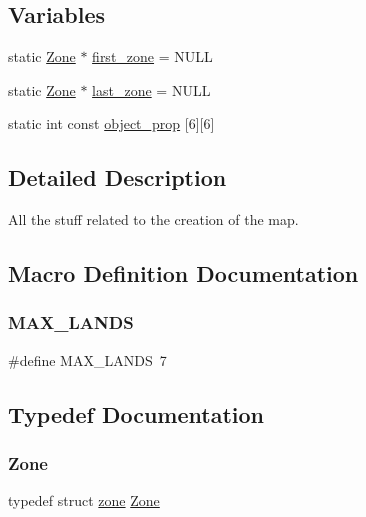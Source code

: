 \subsection*{Variables}
\begin{DoxyCompactItemize}
\item 
static \hyperlink{group__map_ga25bd5049e352284b30a6a239fa772249}{Zone} $\ast$ \hyperlink{group__map_ga77381c292d2d383101eda478b3147d99}{first\+\_\+zone} = N\+U\+LL
\item 
static \hyperlink{group__map_ga25bd5049e352284b30a6a239fa772249}{Zone} $\ast$ \hyperlink{group__map_ga74efc7d85bb74ab5ef4cde960e3c84f5}{last\+\_\+zone} = N\+U\+LL
\item 
static int const \hyperlink{group__map_gaf2350ea2b3737b32c80c5cc2b1e8c434}{object\+\_\+prop} \mbox{[}6\mbox{]}\mbox{[}6\mbox{]}
\end{DoxyCompactItemize}


\subsection{Detailed Description}
All the stuff related to the creation of the map. 

\subsection{Macro Definition Documentation}
\mbox{\label{group__map_ga9c08b7bd8c03fd9c8a06b299e08629d7}} 
\subsubsection{\texorpdfstring{M\+A\+X\+\_\+\+L\+A\+N\+DS}{MAX\_LANDS}}
{\footnotesize\ttfamily \#define M\+A\+X\+\_\+\+L\+A\+N\+DS~7}



\subsection{Typedef Documentation}
\mbox{\label{group__map_ga25bd5049e352284b30a6a239fa772249}} 
\subsubsection{\texorpdfstring{Zone}{Zone}}
{\footnotesize\ttfamily typedef struct \hyperlink{structzone}{zone}  \hyperlink{group__map_ga25bd5049e352284b30a6a239fa772249}{Zone}}



